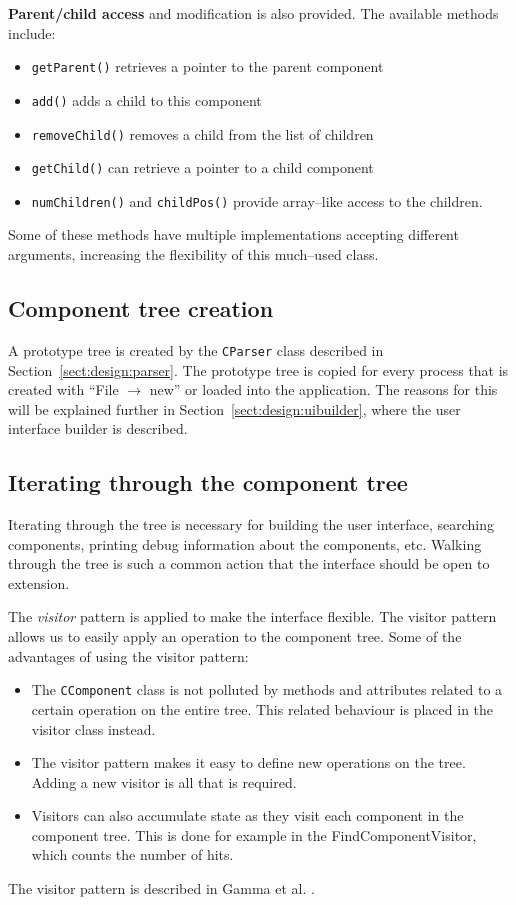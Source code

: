 \bigskip \noindent
\textbf{Parent/child access} and modification is also provided. The available
methods include:
\begin{itemize}
\item \verb=getParent()= retrieves a pointer to the parent component
\item \verb=add()= adds a child to this component
\item \verb=removeChild()= removes a child from the list of children
\item \verb=getChild()= can retrieve a pointer to a child component
\item \verb=numChildren()= and \verb=childPos()= provide array--like access to
the children.
\end{itemize}
Some of these methods have multiple implementations accepting different
arguments, increasing the flexibility of this much--used class.

\subsection{Component tree creation}
A prototype tree is created by the \verb=CParser= class described in
\mbox{Section \ref{sect:design:parser}}. The prototype tree is copied for every
process that is created with ``File $\rightarrow$ new'' or loaded into the
application. The reasons for this will be explained further in \mbox{Section
\ref{sect:design:uibuilder}}, where the user interface builder is described.

\subsection{Iterating through the component tree}
Iterating through the tree is necessary for building the user interface,
searching components, printing debug information about the components, etc.
Walking through the tree is such a common action that the interface should be
open to extension.

The \emph{visitor} pattern is applied to make the interface flexible. The
visitor pattern allows us to easily apply an operation to the component tree.
Some of the advantages of using the visitor pattern:
\begin{itemize}
\item The \verb=CComponent= class is not polluted by methods and attributes related to
a certain operation on the entire tree. This related behaviour is placed in the
visitor class instead.
\item The visitor pattern makes it easy to define new operations on the tree.
Adding a new visitor is all that is required.
\item Visitors can also accumulate state as they visit each component in the
component tree. This is done for example in the FindComponentVisitor, which
counts the number of hits.
\end{itemize}
The visitor pattern is described in Gamma et al. \cite{Gamma}.

